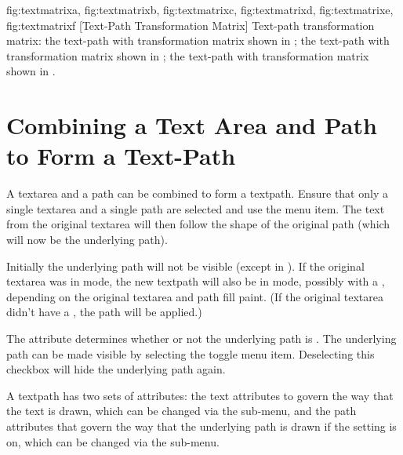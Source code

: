 {
  {fig:textmatrixa}{}{},
  {fig:textmatrixb}{}{},
  {fig:textmatrixc}{}{},
  {fig:textmatrixd}{}{},
  {fig:textmatrixe}{}{},
  {fig:textmatrixf}{}{}
}
[Text-Path Transformation Matrix]
{Text-path transformation matrix:
 the text-path with transformation matrix shown in
;
 the text-path with transformation matrix shown
in ;
 the text-path with transformation matrix
shown in .}

\section{Combining a Text Area and Path to Form a Text-Path}\label{sec:textpath}


A \gls{textarea} and a \gls{path} can be combined to form a
\gls{textpath}. Ensure that only a single \gls{textarea} and a
single \gls{path} are selected and use the 
menu item. The text from the original \gls{textarea} will then follow
the shape of the original path (which will now be the underlying
path).

Initially the underlying path will not be visible (except in \editpathmode).
If the original \gls*{textarea} was in  mode, the new
\gls*{textpath} will also be in  mode, possibly with a 
, depending on the original \gls*{textarea} and \gls*{path}
fill paint. (If the original \gls*{textarea} didn't have a
, the \gls*{path}  will be applied.)

The  attribute
determines whether or not the underlying path is \rendered.
The underlying path can be made visible by selecting the 
 toggle menu item. Deselecting this
checkbox will hide the underlying path again.

A \gls{textpath} has two sets of attributes: the text attributes to
govern the way that the text is drawn, which can be changed via the
 sub-menu, and the path attributes that
govern the way that the underlying path is drawn if the
 setting is on, which can be changed via the 
 sub-menu.

